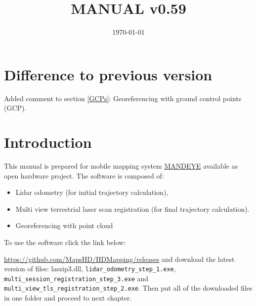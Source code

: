 \documentclass[a4paper,12pt]{book}
\begin{document}
\author{}
\title{MANUAL v0.59}
\date{\today}

\frontmatter
\maketitle
\tableofcontents

\mainmatter

\chapter{Difference to previous version}
Added comment to section \ref{GCPs}: Georeferencing with ground control points (GCP).

\chapter{Introduction}
This manual is prepared for mobile mapping system \href{https://github.com/JanuszBedkowski/mandeye_controller/blob/main/doc/manual/manual_v0_2/mandeye_dev_manual_v0_2.pdf}{MANDEYE} available as open hardware project.
The software is composed of:
\begin{itemize}
	\item Lidar odometry (for initial trajectory calculation),
	\item Multi view terrestrial laser scan registration (for final trajectory calculation).
	\item Georeferencing with point cloud
\end{itemize}
To use the software click the link below:

\url{https://github.com/MapsHD/HDMapping/releases}
\linebreak
and download the latest version of files: laszip3.dll, \verb|lidar_odometry_step_1.exe|, \verb|multi_session_registration_step_3.exe|  and \verb|multi_view_tls_registration_step_2.exe|.
Then put all of the downloaded files in one folder and proceed to next chapter.













\backmatter
\end{document}
